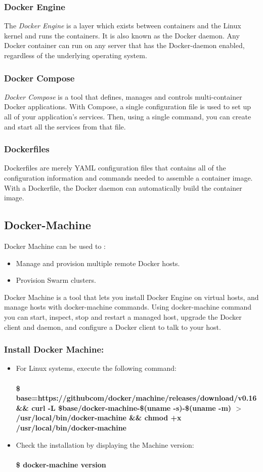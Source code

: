 \documentclass[12pt]{report}
\begin{document}
\subsubsection{Docker Engine}
The \textit{Docker Engine} is a layer which exists between containers and the Linux kernel and runs the containers. It is also known as the Docker daemon. Any Docker container can run on any server that has the Docker-daemon enabled, regardless of the underlying operating system.
\subsubsection{Docker Compose}
\textit{Docker Compose} is a tool that defines, manages and controls multi-container Docker applications. With Compose, a single configuration file is used to set up all of your application’s services. Then, using a single command, you can create and start all the services from that file.
\subsubsection{Dockerfiles}
Dockerfiles are merely YAML configuration files that contains all of the configuration information and commands needed to assemble a container image. With a Dockerfile, the Docker daemon can automatically build the container image.
\subsection{Docker-Machine}
Docker Machine can be used to :
\begin{itemize}
	\item Manage and provision multiple remote Docker hosts.
	\item Provision Swarm clusters.
\end{itemize}
Docker Machine is a tool that lets you install Docker Engine on virtual hosts, and manage hosts with docker-machine commands. Using docker-machine command you can start, inspect, stop and restart a managed host, upgrade the Docker client and daemon, and configure a Docker client to talk to your host.
\subsubsection{Install Docker Machine:}
\begin{itemize}
	\item For Linux systems, execute the following command:\\\\
	\textbf{\$ base=https://githubcom/docker/machine/releases/download/v0.16 \&\& curl -L \$base/docker-machine-\$(uname -s)-\$(uname -m) $>$/usr/local/bin/docker-machine \&\& chmod +x /usr/local/bin/docker-machine}
	\item Check the installation by displaying the Machine version:\\\\
	\textbf{\$ docker-machine version}
\end{itemize}
\end{document}
